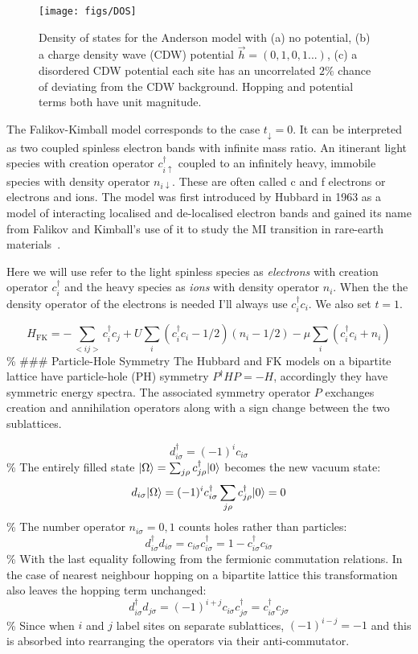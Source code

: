 \begin{figure}
  \centering
    \texttt{[image: figs/DOS]}
  \caption{Density of states for the Anderson model with (a) no potential, (b) a charge density wave (CDW) potential $\vec{h} = (0,1,0,1...)$, (c) a disordered CDW potential each site has an uncorrelated $2\%$ chance of deviating from the CDW background. Hopping and potential terms both have unit magnitude.}
  \label{fig:fk_dos}
\end{figure}

The Falikov-Kimball model corresponds to the case \(t_{\downarrow} = 0\). It can be interpreted as two coupled spinless electron bands with infinite mass ratio. An itinerant light species with creation operator \(c^\dagger_{i\uparrow}\) coupled to an infinitely heavy, immobile species with density operator \(n_{i\downarrow}\). These are often called c and f electrons or electrons and ions. The model was first introduced by Hubbard in 1963 as a model of interacting localised and de-localised electron bands and gained its name from Falikov and Kimball's use of it to study the MI transition in rare-earth materials~\autocite{hubbardj.ElectronCorrelationsNarrow1963,falicov_simple_1969}.

Here we will use refer to the light spinless species as \emph{electrons} with creation operator \(c^\dagger_{i}\) and the heavy species as \emph{ions} with density operator \(n_i\). When the the density operator of the electrons is needed I'll always use \(c^\dagger_{i}c_{i}\). We also set \(t = 1\).

\[
    H_{\mathrm{FK}} = -\sum_{<ij>} c^\dagger_{i}c_{j} + U \sum_{i} (c^\dagger_{i}c_{i} - 1/2)( n_i - 1/2) - \mu \sum_i \left(c^\dagger_{i}c_{i} + n_{i}\right)
\] \% \#\#\# Particle-Hole Symmetry The Hubbard and FK models on a bipartite lattice have particle-hole (PH) symmetry \(P^\dagger H P = - H\), accordingly they have symmetric energy spectra. The associated symmetry operator \(P\) exchanges creation and annihilation operators along with a sign change between the two sublattices.

\[ d^\dagger_{i\sigma} = (-1)^i c_{i\sigma}\] \% The entirely filled state \(|\Omega\rangle = \sum_{j\rho} c^\dagger_{j\rho} |0\rangle\) becomes the new vacuum state: \[d_{i\sigma} |\Omega\rangle = (-1)^i c^\dagger_{i\sigma} \sum_{j\rho} c^\dagger_{j\rho} |0\rangle = 0\] \% The number operator \(n_{i\sigma} = 0,1\) counts holes rather than particles: \[ d^\dagger_{i\sigma} d_{i \sigma} = c_{i\sigma} c^\dagger_{i\sigma} = 1 - c^\dagger_{i\sigma} c_{i\sigma}\] \% With the last equality following from the fermionic commutation relations. In the case of nearest neighbour hopping on a bipartite lattice this transformation also leaves the hopping term unchanged: \[ d^\dagger_{i\sigma} d_{j \sigma} = (-1)^{i+j} c_{i\sigma} c^\dagger_{j\sigma} = c^\dagger_{i\sigma} c_{j\sigma} \] \% Since when \(i\) and \(j\) label sites on separate sublattices, \((-1)^{i-j} = -1\) and this is absorbed into rearranging the operators via their anti-commutator.

